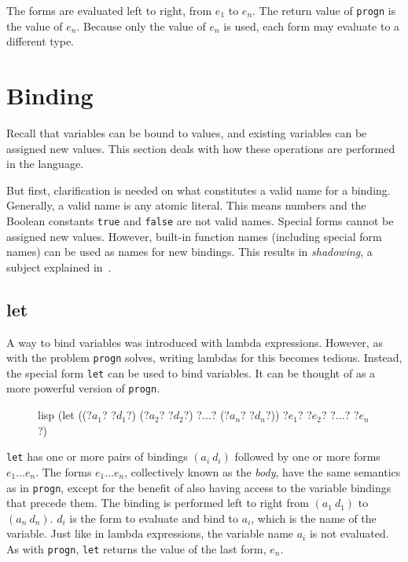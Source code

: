 \documentclass[a4paper, 12pt]{article}
\begin{document}
The forms are evaluated left to right, from $e_1$ to $e_n$. The return value of \texttt{progn} is the value of $e_n$. Because only the value of $e_n$ is used, each form may evaluate to a different type.

\section{Binding}\label{sec:bindingassign}
Recall that variables can be bound to values, and existing variables can be assigned new values. This section deals with how these operations are performed in the language.

But first, clarification is needed on what constitutes a valid name for a binding. Generally, a valid name is any atomic literal. This means numbers and the Boolean constants \texttt{true} and \texttt{false} are not valid names. Special forms cannot be assigned new values. However, built-in function names (including special form names) can be used as names for new bindings. This results in \textit{shadowing}, a subject explained in~.

\subsection{let}
A way to bind variables was introduced with lambda expressions. However, as with the problem \texttt{progn} solves, writing lambdas for this becomes tedious. Instead, the special form \texttt{let} can be used to bind variables. It can be thought of as a more powerful version of \texttt{progn}.

\begin{figure}[htp]
    \centering
    \begin{cminted}[autogobble=true, escapeinside=??]{lisp}
        (let ((?$a_1$? ?$d_1$?) (?$a_2$? ?$d_2$?) ?$\ldots$? (?$a_n$? ?$d_n$?)) ?$e_1$? ?$e_2$? ?$\ldots$? ?$e_n$?)
    \end{cminted}
    \captionsetup[figure]{font=small}
\end{figure}

\texttt{let} has one or more pairs of bindings $(a_i\ d_i)$ followed by one or more forms $e_1 \ldots e_n$. The forms $e_1 \ldots e_n$, collectively known as the \textit{body}, have the same semantics as in \texttt{progn}, except for the benefit of also having access to the variable bindings that precede them. The binding is performed left to right from $(a_1\ d_1)$ to $(a_n\ d_n)$. $d_i$ is the form to evaluate and bind to $a_i$, which is the name of the variable. Just like in lambda expressions, the variable name $a_i$ is not evaluated. As with \texttt{progn}, \texttt{let} returns the value of the last form, $e_n$.
\end{document}
